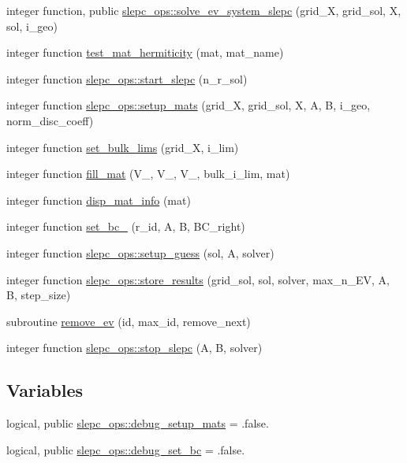 \begin{DoxyCompactItemize}
\item 
integer function, public \hyperlink{namespaceslepc__ops_ad9d4a9b7275ac5a6b9b35e481a7c1710}{slepc\+\_\+ops\+::solve\+\_\+ev\+\_\+system\+\_\+slepc} (grid\+\_\+X, grid\+\_\+sol, X, sol, i\+\_\+geo)
\item 
integer function \hyperlink{SLEPC__ops_8f90_a07b637672a3e89fa9562a693995f857d}{test\+\_\+mat\+\_\+hermiticity} (mat, mat\+\_\+name)
\item 
integer function \hyperlink{namespaceslepc__ops_a5f69f9325197c270c7975f01360a9648}{slepc\+\_\+ops\+::start\+\_\+slepc} (n\+\_\+r\+\_\+sol)
\item 
integer function \hyperlink{namespaceslepc__ops_af8aa2b9b7c5154ebd595afce3f5ebcd0}{slepc\+\_\+ops\+::setup\+\_\+mats} (grid\+\_\+X, grid\+\_\+sol, X, A, B, i\+\_\+geo, norm\+\_\+disc\+\_\+coeff)
\item 
integer function \hyperlink{SLEPC__ops_8f90_aad0c37f65f398c2aa88ea11b21eb2006}{set\+\_\+bulk\+\_\+lims} (grid\+\_\+X, i\+\_\+lim)
\item 
integer function \hyperlink{SLEPC__ops_8f90_a2304e2ffd00378a9252c04507d5a1a7e}{fill\+\_\+mat} (V\+\_, V\+\_, V\+\_, bulk\+\_\+i\+\_\+lim, mat)
\item 
integer function \hyperlink{SLEPC__ops_8f90_a1d58436fdcad8037090c9ce1e50a9ae1}{disp\+\_\+mat\+\_\+info} (mat)
\item 
integer function \hyperlink{SLEPC__ops_8f90_abdaf8a38000d4b3d52de078affcd853d}{set\+\_\+bc\+\_} (r\+\_\+id, A, B, B\+C\+\_\+right)
\item 
integer function \hyperlink{namespaceslepc__ops_a6f6de293e91e94dc92eb6eab0525a96e}{slepc\+\_\+ops\+::setup\+\_\+guess} (sol, A, solver)
\item 
integer function \hyperlink{namespaceslepc__ops_a66241540803bca208b2f3bd6b0448491}{slepc\+\_\+ops\+::store\+\_\+results} (grid\+\_\+sol, sol, solver, max\+\_\+n\+\_\+\+EV, A, B, step\+\_\+size)
\item 
subroutine \hyperlink{SLEPC__ops_8f90_a3200b53f49d7eeb22c2625ac965f9f7c}{remove\+\_\+ev} (id, max\+\_\+id, remove\+\_\+next)
\item 
integer function \hyperlink{namespaceslepc__ops_ae65ae217581e4b5986da87bc9a23acb8}{slepc\+\_\+ops\+::stop\+\_\+slepc} (A, B, solver)
\end{DoxyCompactItemize}
\subsection*{Variables}
\begin{DoxyCompactItemize}
\item 
logical, public \hyperlink{namespaceslepc__ops_aff5aa0d485bc34e2f6e320172fcc4ccb}{slepc\+\_\+ops\+::debug\+\_\+setup\+\_\+mats} = .false.
\item 
logical, public \hyperlink{namespaceslepc__ops_ad57b5fd70608c1b97454963bdd1c4f5b}{slepc\+\_\+ops\+::debug\+\_\+set\+\_\+bc} = .false.
\end{DoxyCompactItemize}


